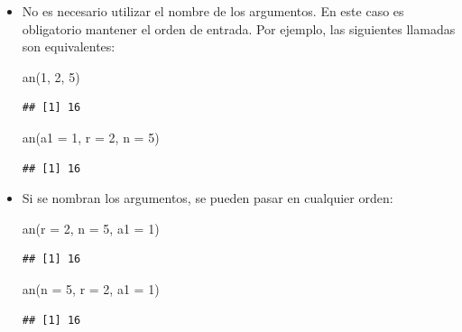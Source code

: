 \documentclass[
]{book}
\newenvironment{Shaded}{\begin{snugshade}}{\end{snugshade}}
\newcommand{\AttributeTok}[1]{\textcolor[rgb]{0.77,0.63,0.00}{#1}}
\newcommand{\DecValTok}[1]{\textcolor[rgb]{0.00,0.00,0.81}{#1}}
\newcommand{\FunctionTok}[1]{\textcolor[rgb]{0.00,0.00,0.00}{#1}}
\newcommand{\NormalTok}[1]{#1}
\theoremstyle{break}
\begin{document}
\begin{itemize}
\item
  No es necesario utilizar el nombre de los argumentos. En este caso
  es obligatorio mantener el orden de entrada.
  Por ejemplo, las siguientes llamadas son equivalentes:

\begin{Shaded}
\begin{Highlighting}[]
\FunctionTok{an}\NormalTok{(}\DecValTok{1}\NormalTok{, }\DecValTok{2}\NormalTok{, }\DecValTok{5}\NormalTok{)}
\end{Highlighting}
\end{Shaded}

\begin{verbatim}
## [1] 16
\end{verbatim}

\begin{Shaded}
\begin{Highlighting}[]
\FunctionTok{an}\NormalTok{(}\AttributeTok{a1 =} \DecValTok{1}\NormalTok{, }\AttributeTok{r =} \DecValTok{2}\NormalTok{, }\AttributeTok{n =} \DecValTok{5}\NormalTok{)}
\end{Highlighting}
\end{Shaded}

\begin{verbatim}
## [1] 16
\end{verbatim}
\item
  Si se nombran los argumentos, se pueden pasar en cualquier orden:

\begin{Shaded}
\begin{Highlighting}[]
\FunctionTok{an}\NormalTok{(}\AttributeTok{r =} \DecValTok{2}\NormalTok{, }\AttributeTok{n =} \DecValTok{5}\NormalTok{, }\AttributeTok{a1 =} \DecValTok{1}\NormalTok{)}
\end{Highlighting}
\end{Shaded}

\begin{verbatim}
## [1] 16
\end{verbatim}

\begin{Shaded}
\begin{Highlighting}[]
\FunctionTok{an}\NormalTok{(}\AttributeTok{n =} \DecValTok{5}\NormalTok{, }\AttributeTok{r =} \DecValTok{2}\NormalTok{, }\AttributeTok{a1 =} \DecValTok{1}\NormalTok{)}
\end{Highlighting}
\end{Shaded}

\begin{verbatim}
## [1] 16
\end{verbatim}
\end{itemize}
\end{document}
